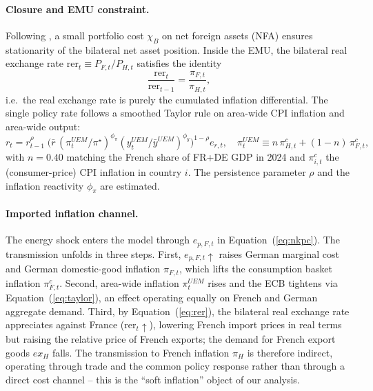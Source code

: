 \documentclass[11pt,a4paper]{article}
\begin{document}
\paragraph{Closure and EMU constraint.}
Following \citet{Schmitt-Grohe2003}, a small portfolio cost
$\chi_B$ on net foreign assets (NFA) ensures stationarity of the
bilateral net asset position. Inside the EMU, the bilateral real
exchange rate $\mathrm{rer}_t \equiv P_{F,t}/P_{H,t}$ satisfies the
identity
\begin{equation}
\frac{\mathrm{rer}_t}{\mathrm{rer}_{t-1}}
= \frac{\pi_{F,t}}{\pi_{H,t}},
\label{eq:rer}
\end{equation}
i.e.\ the real exchange rate is purely the cumulated inflation
differential. The single policy rate follows a smoothed Taylor rule
on area-wide CPI inflation and area-wide output:
\begin{equation}
r_t = r_{t-1}^{\rho}\;\Big(\bar r\,(\pi^{UEM}_t/\pi^{\star})^{\phi_\pi}
                               (y^{UEM}_t/\bar y^{UEM})^{\phi_y}\Big)^{1-\rho} e_{r,t},
\quad \pi^{UEM}_t \equiv n\,\pi^c_{H,t} + (1-n)\,\pi^c_{F,t},
\label{eq:taylor}
\end{equation}
with $n = 0.40$ matching the French share of FR+DE GDP in 2024 and
$\pi^c_{i,t}$ the (consumer-price) CPI inflation in country $i$.
The persistence parameter $\rho$ and the inflation reactivity
$\phi_\pi$ are estimated.

\paragraph{Imported inflation channel.}
The energy shock enters the model through $e_{p,F,t}$ in
Equation~(\ref{eq:nkpc}). The transmission unfolds in three steps.
First, $e_{p,F,t} \uparrow$ raises German marginal cost and German
domestic-good inflation $\pi_{F,t}$, which lifts the consumption
basket inflation $\pi^c_{F,t}$. Second, area-wide inflation
$\pi^{UEM}_t$ rises and the ECB tightens via
Equation~(\ref{eq:taylor}), an effect operating equally on French
and German aggregate demand. Third, by Equation~(\ref{eq:rer}), the
bilateral real exchange rate appreciates against France
($\mathrm{rer}_t \uparrow$), lowering French import prices in real
terms but raising the relative price of French exports;
the demand for French export goods $ex_H$ falls. The transmission
to French inflation $\pi_H$ is therefore indirect, operating through
trade and the common policy response rather than through a direct
cost channel -- this is the ``soft inflation'' object of our
analysis.
\end{document}

